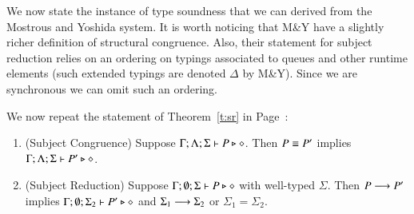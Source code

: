 We now state the instance of type soundness that we can derived from the Mostrous and Yoshida system.
It is worth noticing that M\&Y have a slightly richer definition of structural congruence.
Also, their statement for subject reduction relies on an ordering on typings associated to queues and other 
runtime elements (such extended typings are denoted $\Delta$ by M\&Y).
Since we are synchronous we can omit such an ordering.


We now repeat the statement of Theorem~\ref{t:sr} in Page~\pageref{t:sr}:

\begin{theorem}
	\begin{enumerate}[1.]
		\item	(Subject Congruence) Suppose $\Gamma; \Lambda; \Sigma \vdash P \triangleright \diamond$.
			Then $P \equiv P'$ implies $\Gamma; \Lambda; \Sigma \vdash P' \triangleright \diamond$.

		\item	(Subject Reduction) Suppose $\Gamma; \emptyset; \Sigma \vdash P \triangleright \diamond$
			with
			well-typed $\Sigma$.
			Then $P \longrightarrow P'$ implies $\Gamma; \emptyset; \Sigma_2  \vdash P' \triangleright \diamond$
			and $\Sigma_1 \longrightarrow \Sigma_2$ or $\Sigma_1 = \Sigma_2$.
	\end{enumerate}
\end{theorem}


